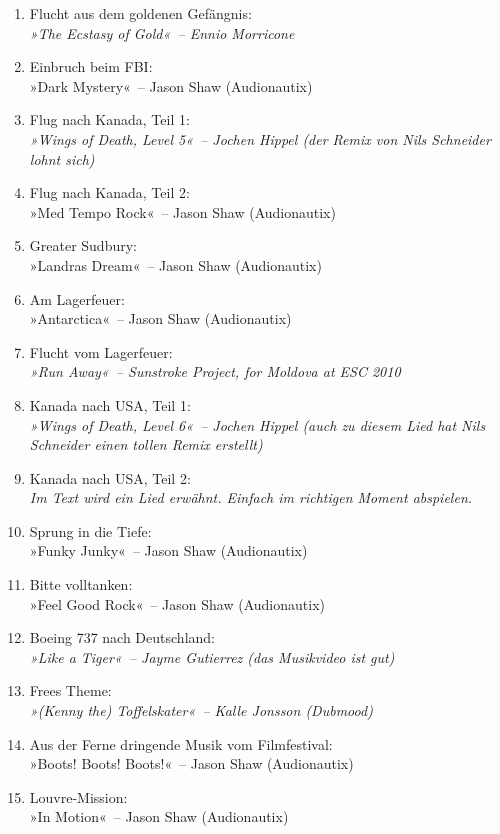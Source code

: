 \begin{enumerate}
    \item Flucht aus dem goldenen Gefängnis:\\ \textit{»The Ecstasy of Gold«~– Ennio Morricone}
    \item Einbruch beim FBI:\\ »Dark Mystery«~– Jason Shaw (Audionautix)
    \item Flug nach Kanada, Teil 1:\\ \textit{»Wings of Death, Level 5«~– Jochen Hippel (der Remix von Nils Schneider lohnt sich)}
    \item Flug nach Kanada, Teil 2:\\ »Med Tempo Rock«~– Jason Shaw (Audionautix)
    \item Greater Sudbury:\\ »Landras Dream«~– Jason Shaw (Audionautix)
    \item Am Lagerfeuer:\\ »Antarctica«~– Jason Shaw (Audionautix)
    \item Flucht vom Lagerfeuer:\\ \textit{»Run Away«~– Sunstroke Project, for Moldova at ESC 2010}
    \item Kanada nach USA, Teil 1:\\ \textit{»Wings of Death, Level 6«~– Jochen Hippel (auch zu diesem Lied hat Nils Schneider einen tollen Remix erstellt)}
    \item Kanada nach USA, Teil 2:\\ \textit{Im Text wird ein Lied erwähnt. Einfach im richtigen Moment abspielen.}
    \item Sprung in die Tiefe:\\ »Funky Junky«~– Jason Shaw (Audionautix)
    \item Bitte volltanken:\\ »Feel Good Rock«~– Jason Shaw (Audionautix)
    \item Boeing 737 nach Deutschland:\\ \textit{»Like a Tiger«~– Jayme Gutierrez (das Musikvideo ist gut)}
    \item Frees Theme:\\ \textit{»(Kenny the) Toffelskater«~– Kalle Jonsson (Dubmood)}
    \item Aus der Ferne dringende Musik vom Filmfestival:\\ »Boots! Boots! Boots!«~– Jason Shaw (Audionautix)
    \item Louvre-Mission:\\ »In Motion«~– Jason Shaw (Audionautix)

\end{enumerate}
